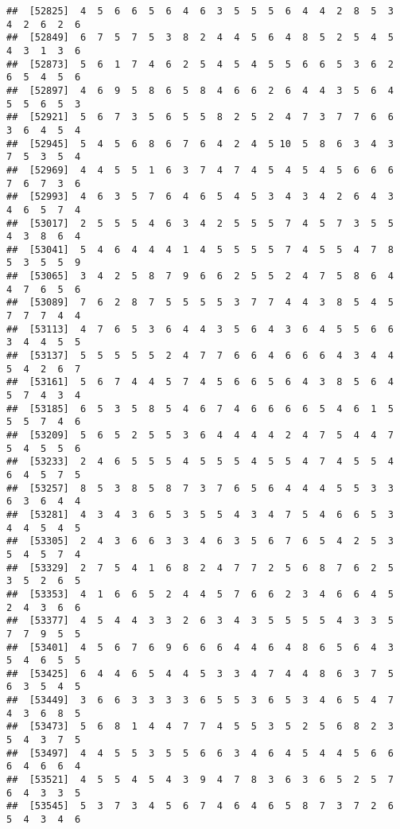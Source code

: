 \documentclass[
]{book}
\begin{document}
\begin{verbatim}
##  [52825]  4  5  6  6  5  6  4  6  3  5  5  5  6  4  4  2  8  5  3  4  2  6  2  6
##  [52849]  6  7  5  7  5  3  8  2  4  4  5  6  4  8  5  2  5  4  5  4  3  1  3  6
##  [52873]  5  6  1  7  4  6  2  5  4  5  4  5  5  6  6  5  3  6  2  6  5  4  5  6
##  [52897]  4  6  9  5  8  6  5  8  4  6  6  2  6  4  4  3  5  6  4  5  5  6  5  3
##  [52921]  5  6  7  3  5  6  5  5  8  2  5  2  4  7  3  7  7  6  6  3  6  4  5  4
##  [52945]  5  4  5  6  8  6  7  6  4  2  4  5 10  5  8  6  3  4  3  7  5  3  5  4
##  [52969]  4  4  5  5  1  6  3  7  4  7  4  5  4  5  4  5  6  6  6  7  6  7  3  6
##  [52993]  4  6  3  5  7  6  4  6  5  4  5  3  4  3  4  2  6  4  3  4  6  5  7  4
##  [53017]  2  5  5  5  4  6  3  4  2  5  5  5  7  4  5  7  3  5  5  4  3  8  6  4
##  [53041]  5  4  6  4  4  4  1  4  5  5  5  5  7  4  5  5  4  7  8  5  3  5  5  9
##  [53065]  3  4  2  5  8  7  9  6  6  2  5  5  2  4  7  5  8  6  4  4  7  6  5  6
##  [53089]  7  6  2  8  7  5  5  5  5  3  7  7  4  4  3  8  5  4  5  7  7  7  4  4
##  [53113]  4  7  6  5  3  6  4  4  3  5  6  4  3  6  4  5  5  6  6  3  4  4  5  5
##  [53137]  5  5  5  5  5  2  4  7  7  6  6  4  6  6  6  4  3  4  4  5  4  2  6  7
##  [53161]  5  6  7  4  4  5  7  4  5  6  6  5  6  4  3  8  5  6  4  5  7  4  3  4
##  [53185]  6  5  3  5  8  5  4  6  7  4  6  6  6  6  5  4  6  1  5  5  5  7  4  6
##  [53209]  5  6  5  2  5  5  3  6  4  4  4  4  2  4  7  5  4  4  7  5  4  5  5  6
##  [53233]  2  4  6  5  5  5  4  5  5  5  4  5  5  4  7  4  5  5  4  6  4  5  7  5
##  [53257]  8  5  3  8  5  8  7  3  7  6  5  6  4  4  4  5  5  3  3  6  3  6  4  4
##  [53281]  4  3  4  3  6  5  3  5  5  4  3  4  7  5  4  6  6  5  3  4  4  5  4  5
##  [53305]  2  4  3  6  6  3  3  4  6  3  5  6  7  6  5  4  2  5  3  5  4  5  7  4
##  [53329]  2  7  5  4  1  6  8  2  4  7  7  2  5  6  8  7  6  2  5  3  5  2  6  5
##  [53353]  4  1  6  6  5  2  4  4  5  7  6  6  2  3  4  6  6  4  5  2  4  3  6  6
##  [53377]  4  5  4  4  3  3  2  6  3  4  3  5  5  5  5  4  3  3  5  7  7  9  5  5
##  [53401]  4  5  6  7  6  9  6  6  6  4  4  6  4  8  6  5  6  4  3  5  4  6  5  5
##  [53425]  6  4  4  6  5  4  4  5  3  3  4  7  4  4  8  6  3  7  5  6  3  5  4  5
##  [53449]  3  6  6  3  3  3  3  6  5  5  3  6  5  3  4  6  5  4  7  4  3  6  8  5
##  [53473]  5  6  8  1  4  4  7  7  4  5  5  3  5  2  5  6  8  2  3  5  4  3  7  5
##  [53497]  4  4  5  5  3  5  5  6  6  3  4  6  4  5  4  4  5  6  6  6  4  6  6  4
##  [53521]  4  5  5  4  5  4  3  9  4  7  8  3  6  3  6  5  2  5  7  6  4  3  3  5
##  [53545]  5  3  7  3  4  5  6  7  4  6  4  6  5  8  7  3  7  2  6  5  4  3  4  6

\end{verbatim}
\end{document}
